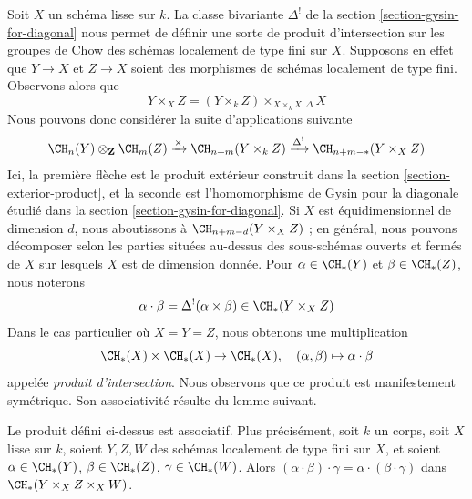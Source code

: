 \medskip\noindent
Soit $X$ un schéma lisse sur $k$. La classe bivariante $\Delta^!$
de la section \ref{section-gysin-for-diagonal} nous permet de définir une sorte de
produit d'intersection sur les groupes de Chow des schémas localement de type fini sur $X$.
Supposons en effet que $Y \to X$ et $Z \to X$ soient des morphismes de schémas
localement de type fini. Observons alors que
$$
Y \times_X Z =  (Y \times_k Z) \times_{X \times_k X, \Delta} X
$$
Nous pouvons donc considérer la suite d'applications suivante
$$
\CH_n(Y) \otimes_\mathbf{Z} \CH_m(Z)
\xrightarrow{\times}
\CH_{n + m}(Y \times_k Z)
\xrightarrow{\Delta^!}
\CH_{n + m - *}(Y \times_X Z)
$$
Ici, la première flèche est le produit extérieur construit dans la
section \ref{section-exterior-product}, et la seconde est l'homomorphisme de Gysin
pour la diagonale étudié dans la
section \ref{section-gysin-for-diagonal}. Si $X$ est équidimensionnel
de dimension $d$, nous aboutissons à $\CH_{n + m - d}(Y \times_X Z)$ ;
en général, nous pouvons décomposer selon les parties situées au-dessus des sous-schémas
ouverts et fermés de $X$ sur lesquels $X$ est de dimension donnée.
Pour $\alpha \in \CH_*(Y)$ et $\beta \in \CH_*(Z)$, nous noterons
$$
\alpha \cdot \beta = \Delta^!(\alpha \times \beta)
\in \CH_*(Y \times_X Z)
$$
Dans le cas particulier où $X = Y = Z$, nous obtenons une multiplication
$$
\CH_*(X) \times \CH_*(X) \to \CH_*(X),\quad
(\alpha, \beta) \mapsto \alpha \cdot \beta
$$
appelée {\it produit d'intersection}. Nous observons que
ce produit est manifestement symétrique. Son associativité résulte du
lemme suivant.

\begin{lemma}
\label{lemma-associative}
Le produit défini ci-dessus est associatif. Plus précisément, soit $k$ un corps,
soit $X$ lisse sur $k$,
soient $Y, Z, W$ des schémas localement de type fini sur $X$, et soient
$\alpha \in \CH_*(Y)$, $\beta \in \CH_*(Z)$, $\gamma \in \CH_*(W)$.
Alors $(\alpha \cdot \beta) \cdot \gamma =
\alpha \cdot (\beta \cdot \gamma)$ dans $\CH_*(Y \times_X Z \times_X W)$.
\end{lemma}

